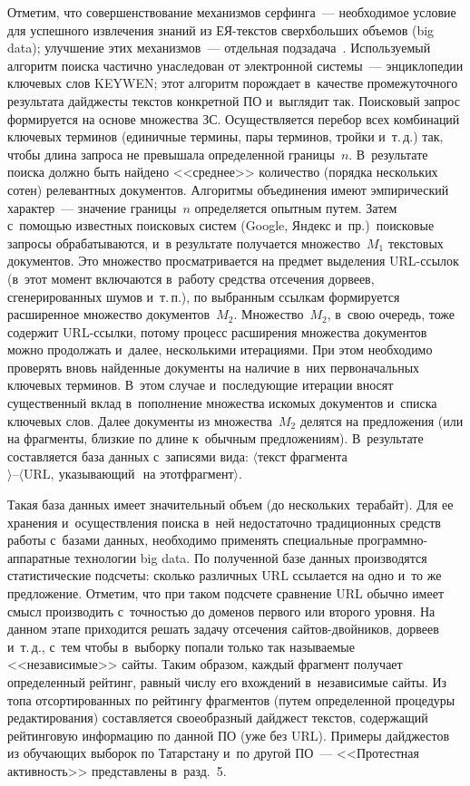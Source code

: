 \begin{multicols}{2}
     Отметим, что совершенствование механизмов серфинга~---
необходимое условие для успешного извлечения знаний из
ЕЯ-текс\-тов сверхбольших объемов (big
data); улучшение этих механизмов~--- отдельная подзадача~\cite{33-koz}.
Используемый алгоритм поиска частично унаследован от электронной
сис\-те\-мы~--- энциклопедии ключевых слов KEYWEN; этот алгоритм порождает
в~качестве промежуточного результата дайджесты текс\-тов конкретной
ПО и~выглядит так. Поисковый запрос формируется на
основе множества ЗС. Осуществляется перебор всех
комбинаций ключевых терминов (единичные термины, пары терминов,
тройки и~т.\,д.) так, чтобы длина запроса не превышала определенной
границы~$n$. В~результате поиска должно быть найдено <<среднее>>
количество (порядка нескольких сотен) релевантных документов. Алгоритмы
объединения имеют эмпирический характер~--- значение границы~$n$
определяется опытным путем. Затем
 с~по\-мощью известных поисковых
систем (Google, Яндекс и~пр.)\ поисковые запросы обрабатываются, и~в
результате получается множество~$M_1$ текс\-то\-вых документов. Это
множество просматривается на предмет выделения URL-ссы\-лок (в~этот
момент включаются в~работу средства отсечения дорвеев,
     сгенерированных шумов и~т.\,п.), по выбранным ссылкам формируется
расширенное множество документов~$M_2$. Множество~$M_2$, в~свою
очередь, тоже содержит URL-ссыл\-ки, потому процесс расширения
множества документов можно продолжать и~далее, несколькими итерациями.
При этом необходимо проверять вновь найденные документы на наличие в~них первоначальных ключевых терминов. В~этом случае и~последующие
итерации вносят существенный вклад в~пополнение множества искомых
документов и~списка ключевых слов. Далее документы из множества~$M_2$
делятся на предложения (или на фрагменты, близкие по длине к~обычным
предложениям). В~результате составляется база данных с~записями вида:
$\langle\mbox{текст}$ фрагмента$\rangle\mbox{--}\langle\mathrm{URL},\
\mbox{указывающий }$ на этот\linebreak $\mbox{фрагмент}\rangle$.

     Такая база данных имеет значительный объем (до нескольких~терабайт). Для
ее хранения и~осуществления поиска в~ней недостаточно традиционных
средств работы с~базами данных, необходимо применять специальные
     про\-граммно-ап\-па\-рат\-ные технологии big data. По полученной базе
данных производятся статистические подсчеты: сколько различных URL
ссылается на одно и~то же предложение. Отметим, что при таком подсчете
сравнение URL обычно имеет смысл производить с~точ\-ностью до доменов
первого или второго уровня. На данном этапе приходится решать задачу
отсечения сай\-тов-двой\-ни\-ков, дорвеев и~т.\,д., с~тем чтобы в~выборку
попали только так называемые <<независимые>> сайты. Таким образом,
каждый фрагмент получает определенный рейтинг, равный числу его
вхождений в~независимые сайты. Из топа отсортированных по рейтингу
фрагментов (путем определенной процедуры редактирования) составляется
своеобразный дайджест текстов, содержащий рейтинговую информацию по
данной ПО (уже без URL). Примеры дайджестов из обучающих выборок по
Татарстану и~по другой ПО~--- <<Протестная активность>>
представлены в~разд.~5.


\end{multicols}
